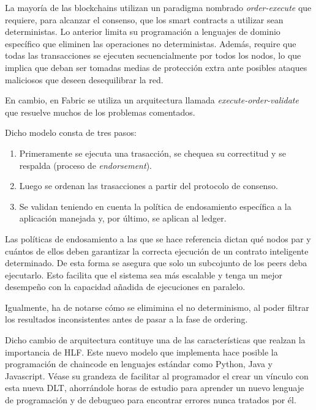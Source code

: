 La mayor\'ia de las blockchains utilizan un paradigma nombrado \emph{order-execute} que requiere, para alcanzar el consenso, que los smart contracts a utilizar sean deterministas. Lo anterior limita su programaci\'on a lenguajes de dominio espec\'ifico que eliminen las operaciones no deterministas. Adem\'as, require que todas las transacciones se ejecuten secuencialmente por todos los nodos, lo que implica que deban ser tomadas medias de protecci\'on extra ante posibles ataques maliciosos que deseen desequilibrar la red.

En cambio, en Fabric se utiliza un arquitectura llamada \emph{execute-order-validate} que resuelve muchos de los problemas comentados.

Dicho modelo consta de tres pasos:
\begin{enumerate}
	\item Primeramente se ejecuta una trasacci\'on, se chequea su correctitud y se respalda (proceso de \emph{endorsement}).
	
	\item Luego se ordenan las trasacciones a partir del protocolo de consenso.
	
	\item Se validan teniendo en cuenta la pol\'itica de endosamiento espec\'ifica a la aplicaci\'on manejada y, por \'ultimo, se aplican al ledger.
\end{enumerate}

Las pol\'iticas de endosamiento a las que se hace referencia dictan qu\'e nodos par y cu\'antos de ellos deben garantizar la correcta ejecuci\'on de un contrato inteligente determinado. De esta forma se asegura que solo un subcojunto de los peers deba ejecutarlo. Esto facilita que el sistema sea m\'as escalable y tenga un mejor desempe\~no con la capacidad a\~nadida de ejecuciones en paralelo.

Igualmente, ha de notarse c\'omo se elimimina el no determinismo, al poder filtrar los resultados inconsistentes antes de pasar a la fase de ordering.

Dicho cambio de arquitectura contituye una de las caracter\'isticas que realzan la importancia de HLF. Este nuevo modelo que implementa hace posible la programaci\'on de chaincode en lenguajes est\'andar como Python, Java y Javascript. V\'ease su grandeza de facilitar al programador el crear un v\'inculo con esta nueva DLT, ahorr\'andole horas de estudio para aprender un nuevo lenguaje de programaci\'on y de debugueo para encontrar errores nunca tratados por \'el.

